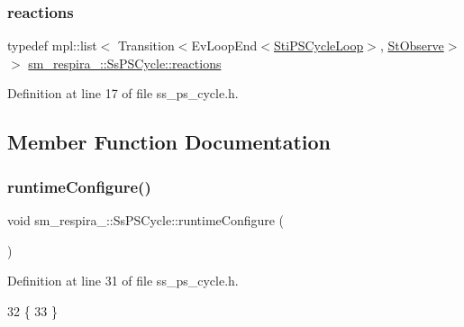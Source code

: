 \subsubsection{\texorpdfstring{reactions}{reactions}}
{\footnotesize\ttfamily typedef mpl\+::list$<$ Transition$<$Ev\+Loop\+End$<$\hyperlink{structsm__respira__1_1_1ps__cycle__inner__states_1_1StiPSCycleLoop}{Sti\+P\+S\+Cycle\+Loop}$>$, \hyperlink{structsm__respira__1_1_1StObserve}{St\+Observe}$>$ $>$ \hyperlink{structsm__respira__1_1_1SsPSCycle_a7f7ede446472e94d9e483f4031ee8c0a}{sm\+\_\+respira\+\_\+::\+Ss\+P\+S\+Cycle\+::reactions}}



Definition at line 17 of file ss\+\_\+ps\+\_\+cycle.\+h.



\subsection{Member Function Documentation}
\mbox{\label{structsm__respira__1_1_1SsPSCycle_a0d9271efe37803ab84f78afdac76e5ff}} 
\subsubsection{\texorpdfstring{runtime\+Configure()}{runtimeConfigure()}}
{\footnotesize\ttfamily void sm\+\_\+respira\+\_\+::\+Ss\+P\+S\+Cycle\+::runtime\+Configure (\begin{DoxyParamCaption}{ }\end{DoxyParamCaption})\hspace{0.3cm}{\ttfamily [inline]}}



Definition at line 31 of file ss\+\_\+ps\+\_\+cycle.\+h.


\begin{DoxyCode}
32   \{
33   \}
\end{DoxyCode}
\mbox{\label{structsm__respira__1_1_1SsPSCycle_a9ba272b79511ad861f97a9db43565514}} 
